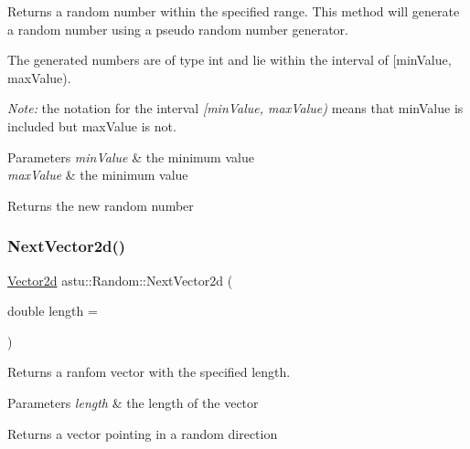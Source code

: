 Returns a random number within the specified range. This method will generate a random number using a pseudo random number generator.

The generated numbers are of type {\ttfamily int} and lie within the interval of \mbox{[}min\+Value, max\+Value).

{\itshape Note\+:} the notation for the interval {\itshape \mbox{[}min\+Value, max\+Value)} means that {\ttfamily min\+Value} is included but {\ttfamily max\+Value} is not.


\begin{DoxyParams}{Parameters}
{\em min\+Value} & the minimum value \\
\hline
{\em max\+Value} & the minimum value \\
\hline
\end{DoxyParams}
\begin{DoxyReturn}{Returns}
the new random number 
\end{DoxyReturn}
\mbox{\label{classastu_1_1Random_a4a01ced84c1d07d593adbdbfbdf65f3a}} 
\subsubsection{\texorpdfstring{Next\+Vector2d()}{NextVector2d()}}
{\footnotesize\ttfamily \hyperlink{classastu_1_1Vector2}{Vector2d} astu\+::\+Random\+::\+Next\+Vector2d (\begin{DoxyParamCaption}\item[{double}]{length = {} }\end{DoxyParamCaption})}

Returns a ranfom vector with the specified length.


\begin{DoxyParams}{Parameters}
{\em length} & the length of the vector \\
\hline
\end{DoxyParams}
\begin{DoxyReturn}{Returns}
a vector pointing in a random direction 
\end{DoxyReturn}
\mbox{\label{classastu_1_1Random_a52486fe2236c1e052bdafdd5072c5cab}} 
